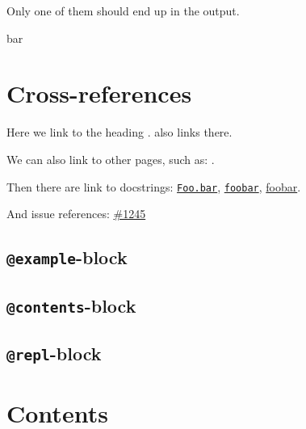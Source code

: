 \label{14134642751930898430}{}


Only one of them should end up in the output.






bar



\section{Cross-references}



\label{12734752257024730942}{}


Here we link to the heading .  also links there.



We can also link to other pages, such as: .



Then there are link to docstrings: \href{@ref}{\texttt{Foo.bar}}, \href{@ref Foo.bar}{\texttt{foobar}}, \href{@ref Foo.bar}{foobar}.



And issue references: \href{https://example.org/Repository.jl/blob/1245}{\#1245}



\subsection{\texttt{@example}-block}



\label{12317204655950454097}{}


\subsection{\texttt{@contents}-block}



\label{5495928211144802529}{}


\subsection{\texttt{@repl}-block}



\label{16839343392674353047}{}


\section{Contents}



